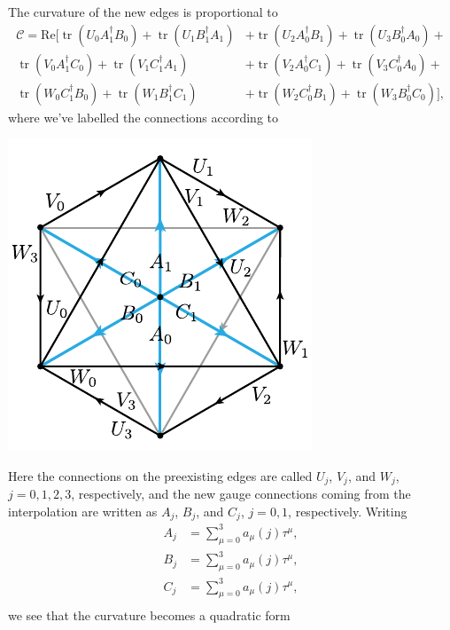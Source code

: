 \documentclass[12pt]{amsart}
\newcommand{\tr}{\operatorname{tr}}
\theoremstyle{definition}
\theoremstyle{remark}
\numberwithin{equation}{section}
\begin{document}
The curvature of the new edges is proportional to
\begin{equation}
	\begin{split}
		\mathcal{C} =\text{Re}\Big[	\tr(U_0 A_1^\dag B_0) + \tr(U_1 B_1^\dag A_1) &+ \tr(U_2 A_0^\dag B_1) + \tr(U_3 B_0^\dag A_0) +  \\
						\tr(V_0 A_1^\dag C_0) + \tr(V_1 C_1^\dag A_1) &+ \tr(V_2 A_0^\dag C_1) + \tr(V_3 C_0^\dag A_0) + \\
						\tr(W_0 C_1^\dag B_0) + \tr(W_1 B_1^\dag C_1) &+ \tr(W_2 C_0^\dag B_1) + \tr(W_3 B_0^\dag C_0)\Big],
	\end{split}
\end{equation}
where we've labelled the connections according to
 \begin{center}
	\includegraphics{diamondconn.pdf}
\end{center}
Here the connections on the preexisting edges are called $U_j$, $V_j$, and $W_j$, $j=0,1,2,3$, respectively, and the new gauge connections coming from the interpolation are written as $A_j$, $B_j$, and $C_j$, $j=0,1$, respectively. 
Writing
\begin{equation}
	\begin{split}
		A_j &= \sum_{\mu = 0}^3 a_\mu(j) \tau^\mu, \\
		B_j &= \sum_{\mu = 0}^3 a_\mu(j) \tau^\mu, \\
		C_j &= \sum_{\mu = 0}^3 a_\mu(j) \tau^\mu, \\
	\end{split}
\end{equation}
we see that the curvature becomes a quadratic form
\end{document}
